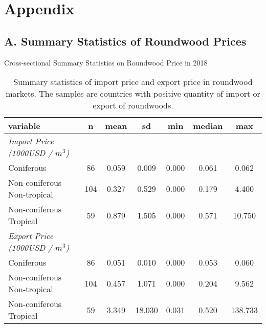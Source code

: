 \documentclass[a4paper,12pt]{article}
\begin{document}


\section*{Appendix}

\subsection*{A. Summary Statistics of Roundwood Prices}
\begin{table}[H]
    \caption{Cross-sectional Summary Statistics on Roundwood Price in 2018}
    \centering
    \begin{tabular}{lcccccc}
        \tabularnewline \midrule \midrule
        variable & n & mean & sd & min & median & max\\
        \midrule
        \emph{Import Price (1000USD / $m^3$)}\\
        Coniferous & 86 & 0.059 & 0.009 & 0.000 & 0.061 & 0.062\\
        Non-coniferous Non-tropical & 104 & 0.327 & 0.529 & 0.000 & 0.179 & 4.400\\
        Non-coniferous Tropical & 59 & 0.879 & 1.505 & 0.000 & 0.571 & 10.750\\
        \midrule
        \emph{Export Price (1000USD / $m^3$)}\\
        Coniferous & 86 & 0.051 & 0.010 & 0.000 & 0.053 & 0.060\\
        Non-coniferous Non-tropical & 104 & 0.457 & 1.071 & 0.000 & 0.204 & 9.562\\
        Non-coniferous Tropical & 59 & 3.349 & 18.030 & 0.031 & 0.520 & 138.733\\
\midrule \midrule
        \end{tabular}
        \caption*{\small{Summary statistics of import price and export price in roundwood markets. The samples are countries with positive quantity of import or export of roundwoods.}}
        \label{tab:summary_stat_price}
 \end{table}
\end{document}
